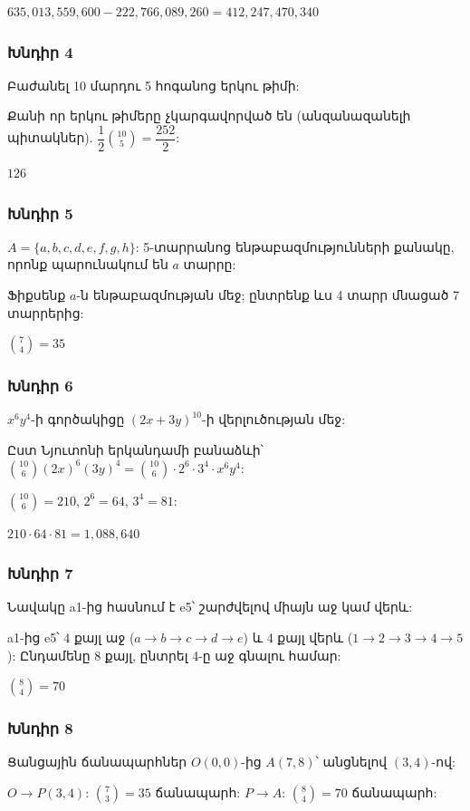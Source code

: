$\boxed{635{,}013{,}559{,}600 - 222{,}766{,}089{,}260 = 412{,}247{,}470{,}340}$

\subsubsection*{Խնդիր 4}
Բաժանել 10 մարդու 5 հոգանոց երկու թիմի:

Քանի որ երկու թիմերը չկարգավորված են (անզանազանելի պիտակներ).
$\dfrac{1}{2}\binom{10}{5} = \dfrac{252}{2}$:

$\boxed{126}$

\subsubsection*{Խնդիր 5}
$A=\{a,b,c,d,e,f,g,h\}$: 5-տարրանոց ենթաբազմությունների քանակը, որոնք պարունակում են $a$ տարրը:

Ֆիքսենք $a$-ն ենթաբազմության մեջ; ընտրենք ևս 4 տարր մնացած 7 տարրերից:

$\boxed{\binom{7}{4} = 35}$

\subsubsection*{Խնդիր 6}
$x^6 y^4$-ի գործակիցը $(2x+3y)^{10}$-ի վերլուծության մեջ:

Ըստ Նյուտոնի երկանդամի բանաձևի՝ $\binom{10}{6}(2x)^6(3y)^4 = \binom{10}{6}\cdot 2^6\cdot 3^4\cdot x^6 y^4$:

$\binom{10}{6}=210$, $2^6=64$, $3^4=81$:

$\boxed{210\cdot 64\cdot 81 = 1{,}088{,}640}$

\subsubsection*{Խնդիր 7}
Նավակը a1-ից հասնում է e5՝ շարժվելով միայն աջ կամ վերև:

a1-ից e5՝ 4 քայլ աջ ($a\to b\to c\to d\to e$) և 4 քայլ վերև ($1\to2\to3\to4\to5$): Ընդամենը 8 քայլ, ընտրել 4-ը աջ գնալու համար:

$\boxed{\binom{8}{4} = 70}$

\subsubsection*{Խնդիր 8}
Ցանցային ճանապարհներ $O(0,0)$-ից $A(7,8)$՝ անցնելով $(3,4)$-ով:

$O\to P(3,4)$: $\binom{7}{3}=35$ ճանապարհ: $P\to A$: $\binom{8}{4}=70$ ճանապարհ:

